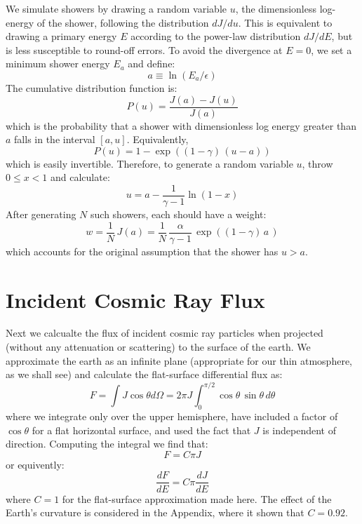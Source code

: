 \documentclass[12pt]{article}
\begin{document}
We simulate showers by drawing a random variable $u$, the
dimensionless log-energy of the shower, following the distribution
$dJ/du$.  This is equivalent to drawing a primary energy $E$ according
to the power-law distribution $dJ/dE$, but is less susceptible to
round-off errors.  To avoid the divergence at $E=0$, we set a minimum
shower energy $E_a$ and define:
$$a \equiv \ln (E_a / \epsilon)$$
The cumulative distribution function is:
$$P(u) = \frac{J(a) - J(u)}{J(a)}$$
which is the probability that a shower with dimensionless log energy greater than $a$ falls in the interval $[a,u]$.
Equivalently,
\begin{equation}
P(u) = 1 - \exp\left( (1-\gamma)\,(u-a) \right)
\end{equation}
which is easily invertible.  Therefore, to generate a random variable $u$, throw $0 \leq x < 1$
and calculate:
\begin{equation}
u = a - \frac{1}{\gamma-1} \ln (1-x)
\end{equation}
After generating $N$ such showers, each should have a weight:
$$w = \frac{1}{N} \, J(a) = \frac{1}{N} \, \frac{\alpha}{\gamma-1} \, \exp\left( (1-\gamma) \, a \, \right)$$
which accounts for the original assumption that the shower has $u > a$.


\section{Incident Cosmic Ray Flux}

Next we calcualte the flux of incident cosmic ray particles when
projected (without any attenuation or scattering) to the surface of
the earth.  We approximate the earth as an infinite plane (appropriate
for our thin atmosphere, as we shall see) and calculate the
flat-surface differential flux as:
$$F = \int  J \cos \theta d\Omega = 2\pi J \int_0^{\pi/2} \cos\theta \, \sin\theta \, d\theta$$
where we integrate only over the upper hemisphere, have included
a factor of $\cos\theta$ for a flat horizontal surface, and used the fact
that $J$ is independent of direction.  Computing the integral we find that:
\begin{equation}
F = C \pi J
\end{equation}
or equivently:
\begin{equation}
\frac{dF}{dE} = C \pi \frac{dJ}{dE}
\end{equation}
where $C=1$ for the flat-surface approximation made here.  The effect
of the Earth's curvature is considered in the Appendix, where it shown
that $C=0.92$.
\end{document}
